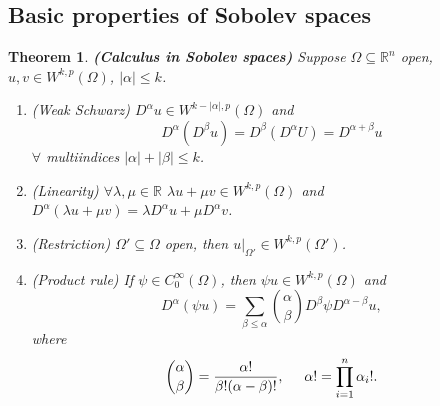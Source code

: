 \documentclass[12pt]{article}
\newtheorem{theorem}{Theorem}[section]
\theoremstyle{definition}
\begin{document}
\subsection{Basic properties of Sobolev spaces}
\begin{theorem}\label{Sobolev_calculus}
\emph{\textbf{(Calculus in Sobolev spaces)}} Suppose $\Omega\subseteq\mathbb R^n$ open, $u,v\in W^{k,p}(\Omega)$, $|\alpha|\leq k$.
\begin{enumerate}[label=(\roman*)]
\item\label{Sobolev_calculus_Schwarz} (Weak Schwarz) $D^\alpha u\in W^{k-|\alpha|,p}(\Omega)$ and
\[D^\alpha(D^\beta u)=D^\beta(D^\alpha U)=D^{\alpha+\beta}u\]
$\forall$ multiindices $|\alpha|+|\beta|\leq k$.

\item\label{Sobolev_calculus_linearity} (Linearity) $\forall\lambda,\mu\in\mathbb R$ $\lambda u+\mu v\in W^{k,p}(\Omega)$ and $D^\alpha(\lambda u+\mu v)=\lambda D^\alpha u+\mu D^\alpha v$.

\item\label{Sobolev_calculus_restriction} (Restriction) $\Omega'\subseteq\Omega$ open, then $u|_{\Omega'}\in W^{k,p}(\Omega')$.

\item\label{Sobolev_calculus_product} (Product rule) If $\psi\in C_0^\infty(\Omega)$, then $\psi u\in W^{k,p}(\Omega)$ and
\begin{equation}\tag{Leibnitz rule}
D^\alpha(\psi u)=\sum_{\beta\leq\alpha}\binom\alpha\beta D^\beta\psi D^{\alpha-\beta}u,
\end{equation}
where
\[\binom\alpha\beta=\frac{\alpha!}{\beta!(\alpha-\beta)!},\hspace{5mm}\alpha!=\prod_{i=1}^n\alpha_i!.\]
\end{enumerate}
\end{theorem}
\end{document}
